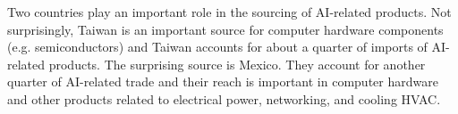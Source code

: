 \documentclass[12pt,pdftex]{article}
\begin{document}
\begin{onehalfspacing}
Two countries play an important role in the sourcing of AI-related products. Not surprisingly, Taiwan is an important source for computer hardware components (e.g. semiconductors) and Taiwan accounts for about a quarter of imports of AI-related products. The surprising source is Mexico. They account for another quarter of AI-related trade and their reach is important in computer hardware and other products related to electrical power, networking, and cooling HVAC. 

 





%
%









\end{onehalfspacing}
\end{document}

